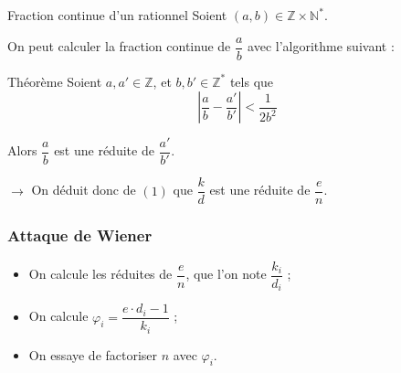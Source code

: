 \documentclass{beamer}
\newcommand{\N}{\mathbb{N}} %
\newcommand{\Z}{\mathbb{Z}} %
\newcommand{\nset}[2]{\left\llbracket #1\ ;\ #2 \right\rrbracket}
\newcommand{\abs}[1]{\left\lvert #1 \right\rvert}
\begin{document}
\begin{frame}[allowframebreaks]
        \newpage


        \begin{block}{Fraction continue d'un rationnel}
            Soient $(a, b) \in \Z \times \N^*$.

            On peut calculer la fraction continue de $\dfrac a b$ avec l'algorithme suivant :

        \end{block}
        \vspace{-10pt}
        

        \begin{block}{Théorème}
            Soient $a, a' \in \Z$, et $b, b' \in \Z^*$ tels que
            \[
                \abs{\dfrac{a}{b} - \dfrac{a'}{b'}} < \dfrac{1}{2b^2}
            \]

            Alors $\dfrac a b$ est une réduite de $\dfrac{a'}{b'}$.
        \end{block}

        \vspace{12pt}
        
        $\rightarrow$ On déduit donc de $(1)$ que $\dfrac k d$ est une réduite de $\dfrac e n$.
    \end{frame}

    \begin{frame}
        \frametitle{Attaque de Wiener}

        \begin{itemize}
            \item<1-> On calcule les réduites de $\dfrac e n$, que l'on note $\dfrac{k_i}{d_i}$ ;

            \vspace{6pt}
            
            \item<2-> On calcule $\varphi_i = \dfrac{e \cdot d_i - 1}{k_i}$ ;

            \vspace{6pt}

            \item<3-> On essaye de factoriser $n$ avec $\varphi_i$.
        \end{itemize}
    \end{frame}
\end{document}
